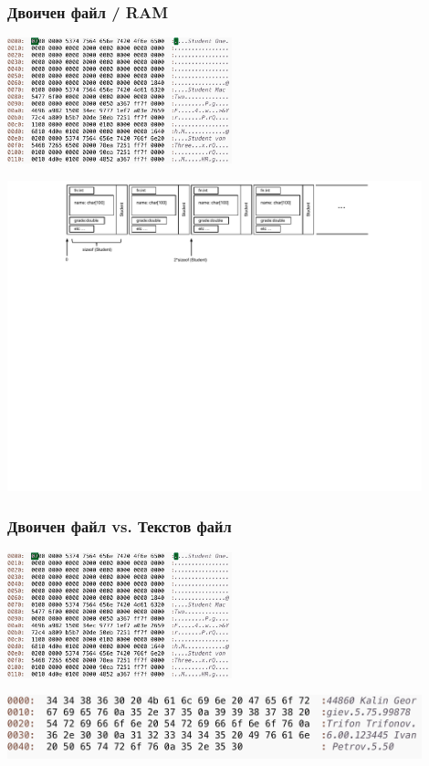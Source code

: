 \documentclass{beamer}
\begin{document}
\begin{frame}[fragile]
\frametitle{Двоичен файл / RAM}



\begin{flushright}
  \includegraphics[width=6.5cm]{images/binfilesslarger}
\end{flushright}

\vspace{20px}
\includegraphics[width=12cm]{images/binfile}


\end{frame}




\begin{frame}[fragile]
\frametitle{Двоичен файл vs. Текстов файл}



\begin{flushright}
  \includegraphics[width=6.5cm]{images/binfilesslarger}
\end{flushright}

\vspace{20px}
\includegraphics[width=12cm]{images/textfilebin}


\end{frame}
\end{document}
